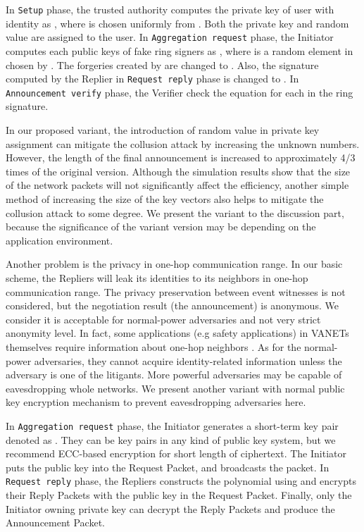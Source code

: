 \documentclass[a4paper]{article}
\begin{document}
In \texttt{Setup} phase, the trusted authority  computes the private key of user with identity  as , where  is chosen uniformly from . Both the private key  and random value  are assigned to the user. In \texttt{Aggregation request} phase, the Initiator  computes each public keys of fake ring signers as , where  is a random element in  chosen by . The forgeries created by  are changed to . Also, the signature computed by the Replier  in \texttt{Request reply} phase is changed to . In \texttt{Announcement verify} phase, the Verifier  check the equation  for each  in the ring signature.

In our proposed variant, the introduction of random value in private key assignment can mitigate the collusion attack by increasing the unknown numbers. However, the length of the final announcement is increased to approximately 4/3 times of the original version. Although the simulation results show that the size of the network packets will not significantly affect the efficiency, another simple method of increasing the size of the key vectors also helps to mitigate the collusion attack to some degree. We present the variant to the discussion part, because the significance of the variant version may be depending on the application environment.

Another problem is the privacy in one-hop communication range. In our basic scheme, the Repliers will leak its identities to its neighbors in one-hop communication range. The privacy preservation between event witnesses is not considered, but the negotiation result (the announcement) is anonymous. We consider it is acceptable for normal-power adversaries and not very strict anonymity level. In fact, some applications (e.g safety applications) in VANETs themselves require information about one-hop neighbors \cite{AS13}. As for the normal-power adversaries, they cannot acquire identity-related information unless the adversary is one of the litigants. More powerful adversaries may be capable of eavesdropping whole networks. We present another variant with normal public key encryption mechanism to prevent eavesdropping adversaries here.

In \texttt{Aggregation request} phase, the Initiator  generates a short-term key pair denoted as . They can be key pairs in any kind of public key system, but we recommend ECC-based encryption for short length of ciphertext. The Initiator puts the public key  into the Request Packet, and broadcasts the packet. In \texttt{Request reply} phase, the Repliers  constructs the polynomial using  and encrypts their Reply Packets with the public key  in the Request Packet. Finally, only the Initiator  owning private key  can decrypt the Reply Packets and produce the Announcement Packet.
\end{document}
